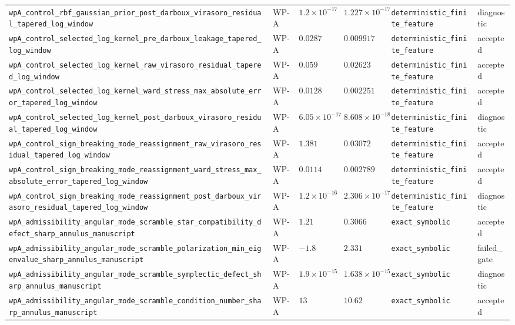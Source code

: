 \begin{table}[t]
\begin{tabular}{@{}llllll@{}}
\texttt{wpA\_control\_rbf\_gaussian\_prior\_post\_darboux\_virasoro\_residual\_tapered\_log\_window} & WP-A & $1.2\times10^{-17}$ & $1.227\times10^{-17}$ & \texttt{deterministic\_finite\_feature} & diagnostic \\
\texttt{wpA\_control\_selected\_log\_kernel\_pre\_darboux\_leakage\_tapered\_log\_window} & WP-A & $0.0287$ & $0.009917$ & \texttt{deterministic\_finite\_feature} & accepted \\
\texttt{wpA\_control\_selected\_log\_kernel\_raw\_virasoro\_residual\_tapered\_log\_window} & WP-A & $0.059$ & $0.02623$ & \texttt{deterministic\_finite\_feature} & accepted \\
\texttt{wpA\_control\_selected\_log\_kernel\_ward\_stress\_max\_absolute\_error\_tapered\_log\_window} & WP-A & $0.0128$ & $0.002251$ & \texttt{deterministic\_finite\_feature} & accepted \\
\texttt{wpA\_control\_selected\_log\_kernel\_post\_darboux\_virasoro\_residual\_tapered\_log\_window} & WP-A & $6.05\times10^{-17}$ & $8.608\times10^{-18}$ & \texttt{deterministic\_finite\_feature} & diagnostic \\
\texttt{wpA\_control\_sign\_breaking\_mode\_reassignment\_raw\_virasoro\_residual\_tapered\_log\_window} & WP-A & $1.381$ & $0.03072$ & \texttt{deterministic\_finite\_feature} & accepted \\
\texttt{wpA\_control\_sign\_breaking\_mode\_reassignment\_ward\_stress\_max\_absolute\_error\_tapered\_log\_window} & WP-A & $0.0114$ & $0.002789$ & \texttt{deterministic\_finite\_feature} & accepted \\
\texttt{wpA\_control\_sign\_breaking\_mode\_reassignment\_post\_darboux\_virasoro\_residual\_tapered\_log\_window} & WP-A & $1.2\times10^{-16}$ & $2.306\times10^{-17}$ & \texttt{deterministic\_finite\_feature} & diagnostic \\
\texttt{wpA\_admissibility\_angular\_mode\_scramble\_star\_compatibility\_defect\_sharp\_annulus\_manuscript} & WP-A & $1.21$ & $0.3066$ & \texttt{exact\_symbolic} & accepted \\
\texttt{wpA\_admissibility\_angular\_mode\_scramble\_polarization\_min\_eigenvalue\_sharp\_annulus\_manuscript} & WP-A & $-1.8$ & $2.331$ & \texttt{exact\_symbolic} & failed\_gate \\
\texttt{wpA\_admissibility\_angular\_mode\_scramble\_symplectic\_defect\_sharp\_annulus\_manuscript} & WP-A & $1.9\times10^{-15}$ & $1.638\times10^{-15}$ & \texttt{exact\_symbolic} & diagnostic \\
\texttt{wpA\_admissibility\_angular\_mode\_scramble\_condition\_number\_sharp\_annulus\_manuscript} & WP-A & $13$ & $10.62$ & \texttt{exact\_symbolic} & accepted \\

\end{tabular}
\end{table}
